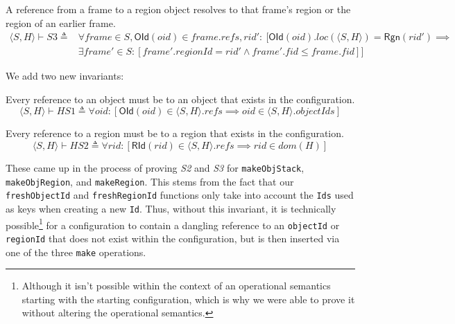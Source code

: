 \documentclass[acmsmall,nonacm,screen]{acmart}
\newcommand{\inN}{\!\in\!}
\begin{document}
\begin{definition}[S3]
A reference from a frame to a region object resolves to that frame's region or the region of an earlier frame.
\begin{align*}
  \langle S, H \rangle \vdash S3 \triangleq{} & \forall frame \inN S, \mathsf{OId}(oid) \inN frame.refs, rid' :\ [\mathsf{OId}(oid).loc(\langle S, H \rangle) = \mathsf{Rgn}(rid') \implies{} \\
  & \exists frame' \inN S : [frame'.regionId = rid' \wedge frame'.fid \le frame.fid]]
\end{align*}
\end{definition}

We add two new invariants:

\begin{definition}[HS1]
  Every reference to an object must be to an object that exists in the configuration.
  \[\langle S, H \rangle \vdash HS1 \triangleq \forall oid : [\mathsf{OId}(oid) \inN \langle S, H \rangle.refs \implies oid \inN \langle S, H \rangle.objectIds]\]
\end{definition}

\begin{definition}[HS2]
  Every reference to a region must be to a region that exists in the configuration.
  \[\langle S, H \rangle \vdash HS2 \triangleq \forall rid : [\mathsf{RId}(rid) \inN \langle S, H \rangle.refs \implies rid \inN dom(H)]\]
\end{definition}

These came up in the process of proving \textit{S2} and \textit{S3} for \texttt{makeObjStack}, \texttt{makeObjRegion}, and \texttt{makeRegion}. This stems from the fact that our \texttt{freshObjectId} and \texttt{freshRegionId} functions only take into account the \texttt{Ids} used as keys when creating a new \texttt{Id}. Thus, without this invariant, it is technically possible\footnote{Although it isn't possible within the context of an operational semantics starting with the starting configuration, which is why we were able to prove it without altering the operational semantics.} for a configuration to contain a dangling reference to an \texttt{objectId} or \texttt{regionId} that does not exist within the configuration, but is then inserted via one of the three \texttt{make} operations.
\end{document}
